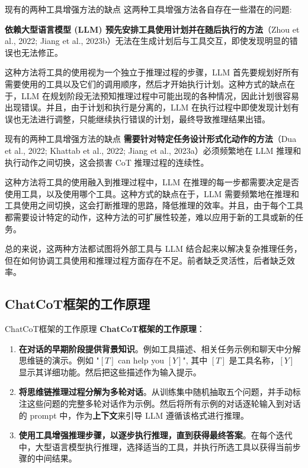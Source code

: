 \begin{frame}{现有的两种工具增强方法的缺点}
    这两种工具增强方法各自存在一些潜在的问题:

        \textbf{依赖大型语言模型 (LLM) 预先安排工具使用计划并在随后执行的方法}（Zhou et al., 2022; Jiang et al., 2023b）无法在生成计划后与工具交互，即使发现明显的错误也无法修正。
        
        \pause
        这种方法将工具的使用视为一个独立于推理过程的步骤，LLM 首先要规划好所有需要使用的工具以及它们的调用顺序，然后才开始执行计划。这种方式的缺点在于，LLM 在规划阶段无法预知推理过程中可能出现的各种情况，因此计划很容易出现错误。并且，由于计划和执行是分离的，LLM 在执行过程中即使发现计划有误也无法进行调整，只能继续执行错误的计划，最终导致推理结果出错。
\end{frame}    
\begin{frame}{现有的两种工具增强方法的缺点}    
        \textbf{需要针对特定任务设计形式化动作的方法}（Dua et al., 2022; Khattab et al., 2022; Jiang et al., 2023a）必须频繁地在 LLM 推理和执行动作之间切换，这会损害 CoT 推理过程的连续性。
        
        \pause
        这种方法将工具的使用融入到推理过程中，LLM 在推理的每一步都需要决定是否使用工具，以及使用哪个工具。这种方式的缺点在于，LLM 需要频繁地在推理和工具使用之间切换，这会打断推理的思路，降低推理的效率。并且，由于每个工具都需要设计特定的动作，这种方法的可扩展性较差，难以应用于新的工具或新的任务。
        
        \pause
    总的来说，这两种方法都试图将外部工具与 LLM 结合起来以解决复杂推理任务，但在如何协调工具使用和推理过程方面存在不足。前者缺乏灵活性，后者缺乏效率。
\end{frame}

\subsection{ChatCoT框架的工作原理}

\begin{frame}{ChatCoT框架的工作原理}
    \textbf{ChatCoT框架的工作原理}：
    \begin{enumerate}
        \item \textbf{在对话的早期阶段提供背景知识}。例如工具描述、相关任务示例和聊天中分解思维链的演示。例如 "\([T]\) can help you \([Y]\)", 其中 \([T]\) 是工具名称，\([Y]\) 显示其详细功能。然后把这些描述作为输入提示。
        \pause
        \item \textbf{将思维链推理过程分解为多轮对话}。从训练集中随机抽取五个问题，并手动标注这些问题的完整多轮对话作为示例。然后将所有示例的对话逐轮输入到对话的 prompt 中，作为\textbf{上下文}来引导 LLM 遵循该格式进行推理。
        \pause
        \item \textbf{使用工具增强推理步骤，以逐步执行推理，直到获得最终答案}。在每个迭代中，大型语言模型执行推理，选择适当的工具，并执行所选工具以获得当前步骤的中间结果。
    \end{enumerate}
\end{frame}   

